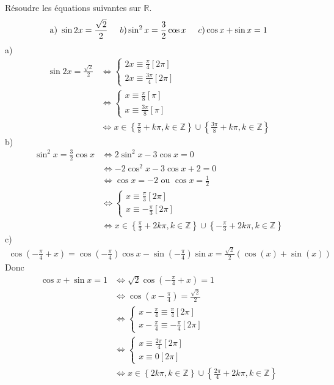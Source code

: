 \documentclass[10pt]{article}
\begin{document}
\begin{tcolorbox}[enhanced, width=6in, center, size=fbox, fontupper=\large, drop shadow southwest]
    Résoudre les équations suivantes sur $\mathbb{R}$.
    \begin{equation*}
        \text{a) } \sin2x=\frac{\sqrt{2}}{2}\hspace{0.5cm}b)\sin^2x=\frac{3}{2}\cos x\hspace{0.5cm}c)\cos x + \sin x = 1
    \end{equation*}
    a)
    \begin{align*}
        \sin2x=\frac{\sqrt{2}}{2}&\iff\begin{cases}2x\equiv\frac{\pi}{4}[2\pi]\\2x\equiv\frac{3\pi}{4}[2\pi]\end{cases}\\
        &\iff\begin{cases}x\equiv\frac{\pi}{8}[\pi]\\x\equiv\frac{3\pi}{8}[\pi]\end{cases}\\
        &\iff x\in\left\{\frac{\pi}{8}+k\pi, k\in\mathbb{Z}\right\}\cup\left\{\frac{3\pi}{8}+k\pi, k\in\mathbb{Z}\right\}
    \end{align*}
    b)
    \begin{align*}
        \sin^2x=\frac{3}{2}\cos x&\iff 2\sin^2x-3\cos x = 0\\
        &\iff -2\cos^2x-3\cos x + 2 = 0\\
        &\iff\cos x = -2 \text{ ou } \cos x = \frac{1}{2}\\
        &\iff\begin{cases}x\equiv\frac{\pi}{3}[2\pi]\\x\equiv-\frac{\pi}{3}[2\pi]\end{cases}\\
        &\iff x\in\left\{\frac{\pi}{3}+2k\pi, k\in\mathbb{Z}\right\}\cup\left\{-\frac{\pi}{3}+2k\pi,k\in\mathbb{Z}\right\}
    \end{align*}
    c)
    \begin{align*}
        \cos(-\frac{\pi}{4}+x)=\cos(-\frac{\pi}{4})\cos x-\sin(-\frac{\pi}{4})\sin x=\frac{\sqrt{2}}{2}\left(\cos(x)+\sin(x)\right)
    \end{align*}
    Donc
    \begin{align*}
        \cos x +  \sin x = 1 &\iff \sqrt{2}\cos(-\frac{\pi}{4}+x)=1\\
        &\iff\cos(x-\frac{\pi}{4})=\frac{\sqrt{2}}{2}\\
        &\iff\begin{cases}x-\frac{\pi}{4}\equiv\frac{\pi}{4}[2\pi]\\x-\frac{\pi}{4}\equiv-\frac{\pi}{4}[2\pi]\end{cases}\\
        &\iff\begin{cases}x\equiv\frac{2\pi}{4}[2\pi]\\x\equiv0[2\pi]\end{cases}\\
        &\iff x\in\left\{2k\pi,k\in\mathbb{Z}\right\}\cup\left\{\frac{2\pi}{4}+2k\pi,k\in\mathbb{Z}\right\}
    \end{align*}
\end{tcolorbox}
\end{document}
